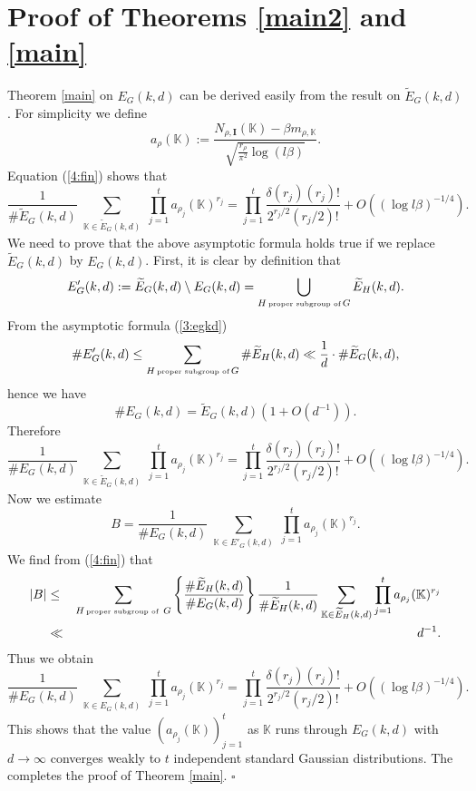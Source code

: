 \documentclass[12pt]{amsart}
\theoremstyle{plain}
\begin{document}
\section{Proof of Theorems \ref{main2} and \ref{main}}
Theorem \ref{main} on $E_G(k,d)$ can be derived easily from the result on $\widetilde{E}_G(k,d)$. For simplicity we define
\[a_{\rho}({{\mathbb K}}):=\frac{N_{\rho,{{\mathbf I}}}({{\mathbb K}})-\beta m_{\rho,{{\mathbb K}}}}{\sqrt{\frac{r_{\rho}}{\pi^2}\log (l \beta)}}. \]
Equation (\ref{4:fin}) shows that
\[\frac{1}{\#\widetilde{E}_G(k,d)}\sum_{\substack{{{\mathbb K}} \in \widetilde{E}_G(k,d)}}\prod_{j=1}^t a_{\rho_j}({{\mathbb K}})^{r_j}=\prod_{j=1}^t\frac{\delta(r_j) (r_j)! }{2^{r_j/2} \left(r_j/2\right)! }+O\left((\log l \beta)^{-1/4}\right). \]
We need to prove that the above asymptotic formula holds true if we replace $\widetilde{E}_G(k,d)$ by $E_G(k,d)$. First, it is clear by definition that
\[E'_G(k,d):=\widetilde{E}_G(k,d) \setminus E_G(k,d)=\bigcup_{H \, \mbox{\tiny proper subgroup of} \, G} \widetilde{E}_H(k,d). \]
From the asymptotic formula (\ref{3:egkd})
\[\#E'_G(k,d) \le \sum_{H \, \mbox{\tiny proper subgroup of} \, G} \# \widetilde{E}_H(k,d) \ll \frac{1}{d} \cdot \#\widetilde{E}_G(k,d),\]
hence we have
\[\#E_{G}(k,d)=\widetilde{E}_G(k,d) \left(1+O(d^{-1})\right). \]
Therefore
\[\frac{1}{\#{E}_G(k,d)}\sum_{\substack{{{\mathbb K}} \in \widetilde{E}_G(k,d)}}\prod_{j=1}^t a_{\rho_j}({{\mathbb K}})^{r_j}=\prod_{j=1}^t\frac{\delta(r_j) (r_j)! }{2^{r_j/2} \left(r_j/2\right)! }+O\left((\log l \beta)^{-1/4}\right). \]
Now we estimate
\[B=\frac{1}{\#{E}_G(k,d)}\sum_{\substack{{{\mathbb K}} \in E'_G(k,d)}}\prod_{j=1}^t a_{\rho_j}({{\mathbb K}})^{r_j}.\]
We find from (\ref{4:fin}) that
\begin{eqnarray*} |B| &\le & \sum_{\substack{H \, \mbox{\tiny proper subgroup of }\, G}} \left\{\frac{\# \widetilde{E}_H(k,d)}{\#E_G(k,d)}\right\} \frac{1}{ \# \widetilde{E}_H(k,d)} \sum_{{{\mathbb K}} \in \widetilde{E}_H(k,d)} \prod_{j=1}^t a_{\rho_j}({{\mathbb K}})^{r_j}\\
& \ll & d^{-1}. \end{eqnarray*}
Thus we obtain
\[\frac{1}{\#E_G(k,d)}\sum_{\substack{{{\mathbb K}} \in E_G(k,d)}} \prod_{j=1}^t a_{\rho_j}({{\mathbb K}})^{r_j}=\prod_{j=1}^t\frac{\delta(r_j) (r_j)! }{2^{r_j/2} \left(r_j/2\right)! }+O\left((\log l \beta)^{-1/4}\right). \]
This shows that the value $\left(a_{\rho_j}({{\mathbb K}})\right)_{j=1}^t$ as ${{\mathbb K}}$ runs through $E_G(k,d)$ with $d \to \infty$ converges weakly to $t$ independent standard Gaussian distributions. The completes the proof of Theorem \ref{main}. \quad $\square$
\end{document}
